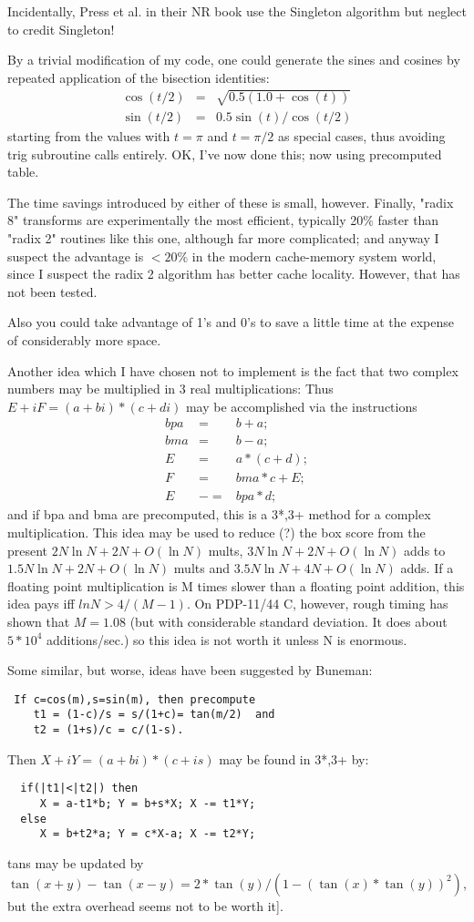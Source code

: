 Incidentally, Press et al. in their NR book use the Singleton algorithm
but neglect to credit Singleton!

By a trivial modification of my code, one could generate the sines and
cosines by repeated application of the bisection identities:
\begin{eqnarray}
    \cos(t/2) & = & \sqrt{0.5 (1.0 + \cos(t))}\\
    \sin(t/2) & = & 0.5 \sin(t)/\cos(t/2)
\end{eqnarray}
starting from the values with $t=\pi$ and $t=\pi/2$ as special cases, thus
avoiding trig subroutine calls entirely. 
OK, I've now done this; now using precomputed table.

The time savings introduced by either of these is small, however.
Finally, "radix 8" transforms are experimentally the most efficient,
typically 20\% faster than "radix 2" routines like this one, although far
more complicated; and anyway I suspect the advantage is $<20\%$ 
in the modern cache-memory system world, since I suspect the radix 2 algorithm
has better cache locality. However, that has not been tested.

Also you could take advantage of 1's and 0's to save a little time at
the expense of considerably more space.

Another idea which I have chosen not to implement is the fact that two
complex numbers may be multiplied in 3 real multiplications:
Thus  $E+iF = (a+bi)*(c+di)$  may be accomplished via the instructions
\begin{eqnarray}
  bpa & = & b+a; \\
  bma & = & b-a; \\
  E & = & a*(c+d);\\ 
  F & = & bma*c+E; \\
  E & -= & bpa*d;
\end{eqnarray}
and if bpa and bma are precomputed, this is a 3*,3+ method for a complex
multiplication. This idea may be used to reduce (?) the box score from
the present  $2N \ln N+2N+O(\ln N)$ mults, 
$3N \ln N+2N+O(\ln N)$ adds  to
$1.5N \ln N+2N+O(\ln N)$ mults  and  $3.5N \ln N+4N+O(\ln N)$ adds. 
If a floating point
multiplication is M times slower than a floating point addition,
this idea pays iff $ln N>4/(M-1)$. On PDP-11/44 C, however, rough timing
has shown that $M=1.08$ (but with considerable standard deviation.
It does
about $5*10^4$ additions/sec.) so this idea is not worth it unless N is
enormous.

Some similar, but worse, ideas have been suggested by Buneman:
\begin{verbatim}
 If c=cos(m),s=sin(m), then precompute  
    t1 = (1-c)/s = s/(1+c)= tan(m/2)  and
    t2 = (1+s)/c = c/(1-s). 
\end{verbatim}
Then $X+iY = (a+bi)*(c+is)$ may be found in 3*,3+ by:
\begin{verbatim}
  if(|t1|<|t2|) then
     X = a-t1*b; Y = b+s*X; X -= t1*Y;
  else
     X = b+t2*a; Y = c*X-a; X -= t2*Y;
\end{verbatim}
tans may be updated by  
$\tan(x+y)-\tan(x-y) = 2*\tan(y)/(1-(\tan(x)*\tan(y))^2)$,
but the extra overhead seems not to be worth it].

